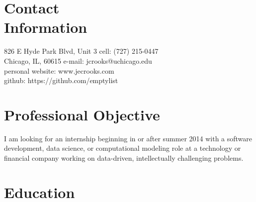 \documentclass[margin,line]{resume}
\begin{document}
\begin{resume}

    \section{\mysidestyle Contact\\Information}
    826 E Hyde Park Blvd, Unit 3    
    \hfill cell: (727) 215-0447 
    \vspace{0mm} \\
    \vspace{0mm}
    Chicago, IL, 60615
    \hfill e-mail: jcrooks@uchicago.edu 
    \vspace{0mm} \\
    \vspace{0mm}
    \hfill personal website: www.jecrooks.com  
    \vspace{0mm} \\
    \vspace{0mm}
    \hfill github: https://github.com/emptylist 
    \vspace{0mm} \\
    \vspace{-4.5mm}
    
    \section{\mysidestyle Professional Objective}
    I am looking for an internship beginning in or after summer 2014 with a software development, data science, or computational modeling role at a technology or financial company working on data-driven, intellectually challenging problems.
    \vspace{-2mm}

    \section{\mysidestyle Education}


\end{resume}
\end{document}
